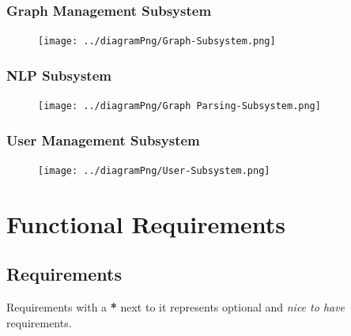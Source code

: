\documentclass[11pt,a4paper]{article}
\begin{document}
\pagebreak
{}
\subsubsection*{Graph Management Subsystem}
\begin{figure}[htbp]
  \centering
  \texttt{[image: ../diagramPng/Graph-Subsystem.png]}
\end{figure}

\pagebreak

\subsubsection*{NLP Subsystem}
\begin{figure}[htbp]
    \centering
    \texttt{[image: ../diagramPng/Graph Parsing-Subsystem.png]}
\end{figure}

\pagebreak
{}
\subsubsection*{User Management Subsystem}
\begin{figure}[htbp]
    \centering
    \texttt{[image: ../diagramPng/User-Subsystem.png]}
\end{figure}

\pagebreak

\section*{Functional Requirements}

\subsection*{Requirements}

Requirements with a \textbf{*} next to it represents optional and \textit{nice
to have} requirements.
\end{document}
